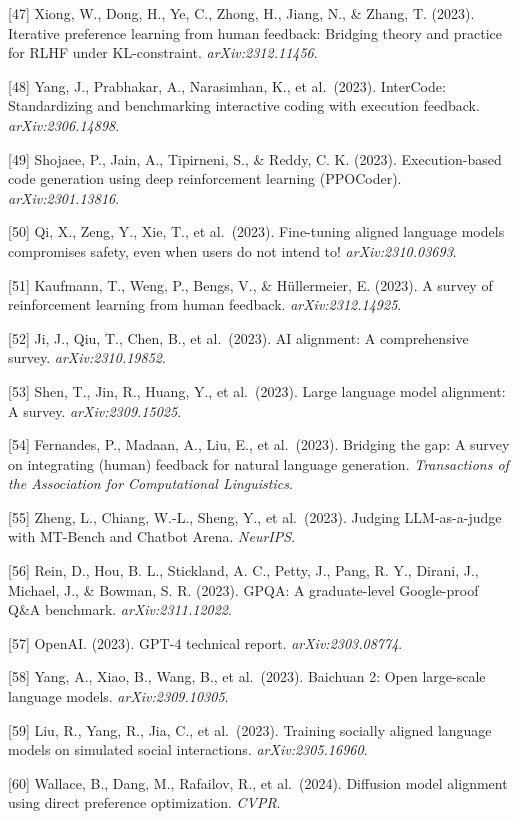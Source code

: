 {[}47{]} Xiong, W., Dong, H., Ye, C., Zhong, H., Jiang, N., \& Zhang, T. (2023). Iterative preference learning from human feedback: Bridging theory and practice for RLHF under KL-constraint. \emph{arXiv:2312.11456}.

{[}48{]} Yang, J., Prabhakar, A., Narasimhan, K., et al.~(2023). InterCode: Standardizing and benchmarking interactive coding with execution feedback. \emph{arXiv:2306.14898}.

{[}49{]} Shojaee, P., Jain, A., Tipirneni, S., \& Reddy, C. K. (2023). Execution-based code generation using deep reinforcement learning (PPOCoder). \emph{arXiv:2301.13816}.

{[}50{]} Qi, X., Zeng, Y., Xie, T., et al.~(2023). Fine-tuning aligned language models compromises safety, even when users do not intend to! \emph{arXiv:2310.03693}.

{[}51{]} Kaufmann, T., Weng, P., Bengs, V., \& Hüllermeier, E. (2023). A survey of reinforcement learning from human feedback. \emph{arXiv:2312.14925}.

{[}52{]} Ji, J., Qiu, T., Chen, B., et al.~(2023). AI alignment: A comprehensive survey. \emph{arXiv:2310.19852}.

{[}53{]} Shen, T., Jin, R., Huang, Y., et al.~(2023). Large language model alignment: A survey. \emph{arXiv:2309.15025}.

{[}54{]} Fernandes, P., Madaan, A., Liu, E., et al.~(2023). Bridging the gap: A survey on integrating (human) feedback for natural language generation. \emph{Transactions of the Association for Computational Linguistics}.

{[}55{]} Zheng, L., Chiang, W.-L., Sheng, Y., et al.~(2023). Judging LLM-as-a-judge with MT-Bench and Chatbot Arena. \emph{NeurIPS}.

{[}56{]} Rein, D., Hou, B. L., Stickland, A. C., Petty, J., Pang, R. Y., Dirani, J., Michael, J., \& Bowman, S. R. (2023). GPQA: A graduate-level Google-proof Q\&A benchmark. \emph{arXiv:2311.12022}.

{[}57{]} OpenAI. (2023). GPT-4 technical report. \emph{arXiv:2303.08774}.

{[}58{]} Yang, A., Xiao, B., Wang, B., et al.~(2023). Baichuan 2: Open large-scale language models. \emph{arXiv:2309.10305}.

{[}59{]} Liu, R., Yang, R., Jia, C., et al.~(2023). Training socially aligned language models on simulated social interactions. \emph{arXiv:2305.16960}.

{[}60{]} Wallace, B., Dang, M., Rafailov, R., et al.~(2024). Diffusion model alignment using direct preference optimization. \emph{CVPR}.

